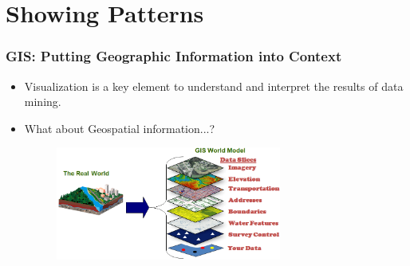 \documentclass[hyperref={pdfpagelabels=true}]{beamer}
\begin{document}
\section{Showing Patterns} 
\begin{frame}

\frametitle{GIS: Putting Geographic Information into Context}
    \begin{itemize}
      \item<1->Visualization is a key element to understand and interpret the results of data mining.%
      \item<1->What about Geospatial information...?
      \begin{figure}  
	\includegraphics[width=0.7\textwidth]{gis.PNG}
       \end{figure}  
    \end{itemize}
\end{frame}
\end{document}
